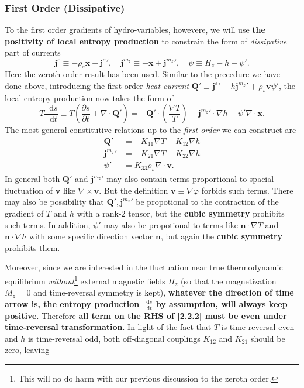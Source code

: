 \documentclass[10pt,nofootinbib,letterpaper]{revtex4}
\newcommand*\dd{\mathop{}\!\mathrm{d}}
\begin{document}
		\subsubsection{First Order (Dissipative)}
			To the first order gradients of hydro-variables, howevere, we will use {\bf the positivity of local entropy production} to constrain the form of \emph{dissipative} part of currents
			\begin{equation}\label{2.2.1}
				\bm{j}^\varepsilon\equiv-\rho_s\bm{x}+{\bm{j}^\varepsilon}',\quad\bm{j}^{m_z}\equiv-\bm{x}+{\bm{j}^{m_z}}',\quad \psi\equiv H_z-h+\psi'.
			\end{equation}
			Here the zeroth-order result has been used.	Similar to the precedure we have done above, introducing the first-order \emph{heat current} $\bm{Q'}\equiv{\bm{j}^\varepsilon}'-h{\bm{j}^{m_z}}'+\rho_s\bm{v}\psi'$, the local entropy production now takes the form of
			\begin{equation}\label{2.2.2}
				T\dfrac{\dd s}{\dd t}\equiv T \left(\dfrac{\partial s}{\partial t}+\nabla\cdot\bm{Q'}\right)=-\bm{Q'}\cdot\left(\dfrac{\nabla T}{T}\right)-{\bm{j}^{m_z}}'\cdot\nabla h-\psi'\nabla\cdot\bm{x}.
			\end{equation}
			The most general constitutive relations up to the \emph{first order} we can construct are
			\begin{align*}
				\bm{Q}'&=-K_{11}\nabla T-K_{12}\nabla h\\
				{\bm{j}^{m_z}}'&=-K_{21}\nabla T-K_{22}\nabla h\\
				\psi'&=K_{33}\rho_s\nabla\cdot\bm{v}.
			\end{align*}
			In general both $\bm{Q}'$ and ${\bm{j}^{m_z}}'$ may also contain terms proportional to spacial fluctuation of $\bm{v}$ like $\nabla\times\bm{v}$. But the definition $\bm{v}\equiv\nabla\varphi$ forbids such terms. There may also be possibility that $\bm{Q'},{\bm{j}^{m_z}}'$ be propotional to the contraction of the gradient of $T$ and $h$ with a rank-$2$ tensor, but the {\color{red}\textbf{cubic symmetry}} prohibits such terms. In addition, $\psi'$ may also be propotional to terms like $\bm{n}\cdot\nabla T$ and $\bm{n}\cdot\nabla h$ with some specific direction vector $\bm{n}$, but again the {\color{red}\textbf{cubic symmetry}} prohibits them.\par
			Moreover, since we are interested in the fluctuation near true thermodynamic equilibrium \emph{without}\footnote{This will no do harm with our previous discussion to the zeroth order.} external magnetic fields $H_z$ (so that the magnetization $M_z=0$ and time-reversal symmetry is kept), \textbf{\color{red} whatever the direction of time arrow is, the entropy production $\frac{\dd s}{\dd t}$ by assumption, will always keep positive}. Therefore \textbf{all term on the RHS of \eqref{2.2.2} must be even under time-reversal transformation}. In light of the fact that $T$ is time-reversal even and $h$ is time-reversal odd, both off-diagonal couplings $K_{12}$ and $K_{21}$ should be zero, leaving
\end{document}
